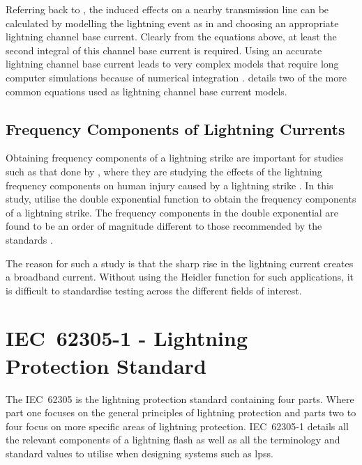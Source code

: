 Referring back to , the induced effects on a nearby transmission line can be calculated by modelling the lightning event as in  and choosing an appropriate lightning channel base current. Clearly from the equations above, at least the second integral of this channel base current is required. Using an accurate lightning channel base current leads to very complex models that require long computer simulations because of numerical integration \cite{Paolone2009}.  details two of the more common equations used as lightning channel base current models.

\subsection{Frequency Components of Lightning Currents}
\label{sub:background_frequency_components_of_lightning_currents}
Obtaining frequency components of a lightning strike are important for studies such as that done by \citeauthor{Lee2014}, where they are studying the effects of the lightning frequency components on human injury caused by a lightning strike \cite{Lee2014}. In this study, \citeauthor{Lee2014} utilise the double exponential function to obtain the frequency components of a lightning strike. The frequency components in the double exponential are found to be an order of magnitude different to those recommended by the standards \cite{1422588}.

The reason for such a study is that the sharp rise in the lightning current creates a broadband current. Without using the Heidler function for such applications, it is difficult to standardise testing across the different fields of interest.


\section{IEC~62305-1 - Lightning Protection Standard}
\label{sec:background_iec62305}
The IEC~62305 is the lightning protection standard containing four parts. Where part one focuses on the general principles of lightning protection and parts two to four focus on more specific areas of lightning protection. IEC~62305-1 details all the relevant components of a lightning flash as well as all the terminology and standard values to utilise when designing systems such as \glspl{lps}.

